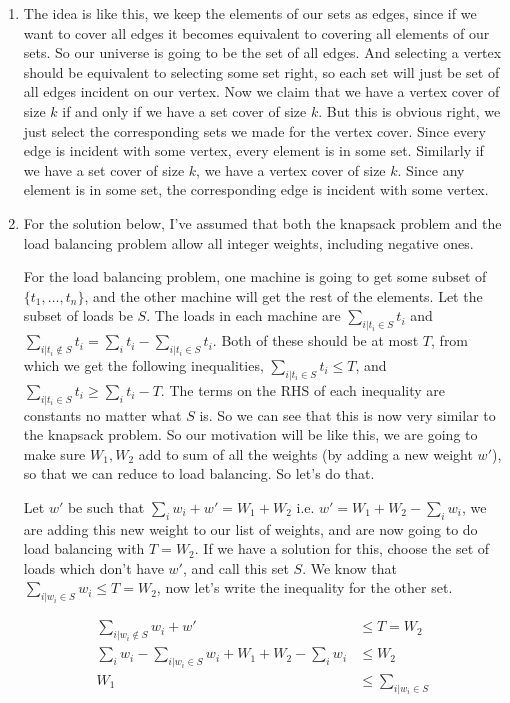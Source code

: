 \documentclass[12pt]{report}
\begin{document}
\begin{enumerate}[label=\textbf{\arabic*.}]
    \item The idea is like this, we keep the elements of our sets as edges, since if we want to cover all edges it becomes equivalent to
    covering all elements of our sets. So our universe is going to be the set of all edges.
    And selecting a vertex should be equivalent to selecting some set right, so each set will just be set of all edges incident on our vertex.
    Now we claim that we have a vertex cover of size $k$ if and only if we have a set cover of size $k$. But this is obvious right, we just 
    select the corresponding sets we made for the vertex cover. Since every edge is incident with some vertex, every element is in some set.
    Similarly if we have a set cover of size $k$, we have a vertex cover of size $k$. Since any element is in some set, the corresponding edge 
    is incident with some vertex.

    \item For the solution below, I've assumed that both the knapsack problem and the load balancing problem allow all integer weights, including
    negative ones. 
    
    For the load balancing problem, one machine is going to get some subset of $\{t_1, \dots, t_n\}$, and the other machine will get
    the rest of the elements. Let the subset of loads be $S$. The loads in each machine are $\sum_{i|t_i \in S} t_i$ and 
    $\sum_{i|t_i \notin S} t_i = \sum_i t_i - \sum_{i|t_i \in S} t_i$. Both of these should be at most $T$, from which we get the following 
    inequalities, $\sum_{i|t_i \in S} t_i \leq T$, and $\sum_{i|t_i \in S} t_i \geq \sum_i t_i - T$. The terms on the RHS of each inequality are 
    constants no matter what $S$ is. So we can see that this is now very similar to the knapsack problem. So our motivation will be like this,
    we are going to make sure $W_1, W_2$ add to sum of all the weights (by adding a new weight $w'$), 
    so that we can reduce to load balancing. So let's do that.

    Let $w'$ be such that $\sum_i w_i + w' = W_1 + W_2$ i.e. $w' = W_1 + W_2 - \sum_i w_i$, we are adding this new weight to our list of weights,
    and are now going to do load balancing with $T = W_2$. If we have a solution for this, choose the set of loads which don't have $w'$, and 
    call this set $S$. We know that $\sum_{i|w_i \in S} w_i \leq T = W_2$, now let's write the inequality for the other set.

    \begin{align*}
        \sum_{i|w_i \notin S} w_i + w' &\leq T = W_2 \\
        \sum_i w_i - \sum_{i|w_i \in S} w_i + W_1 + W_2 - \sum_i w_i &\leq W_2 \\
        W_1 &\leq \sum_{i|w_i \in S} 
    \end{align*}


\end{enumerate}
\end{document}
